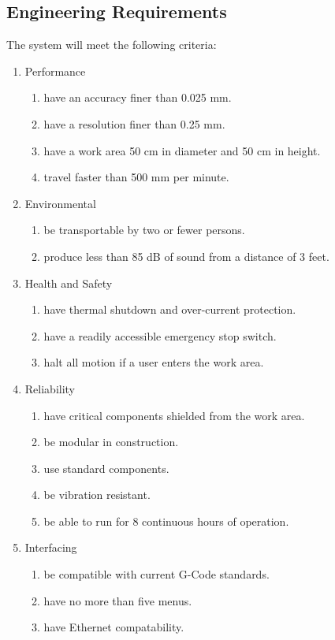 \documentclass[11pt]{report}
\begin{document}
\subsection{Engineering Requirements}
The system will meet the following criteria:
\begin{enumerate} \parskip2pt
	\item Performance
	\begin{enumerate}
		\item have an accuracy finer than 0.025 mm.
		\item have a resolution finer than 0.25 mm.
		\item have a work area 50 cm in diameter and 50 cm in height.
		\item travel faster than 500 mm per minute.
	\end{enumerate}

	\item Environmental
	\begin{enumerate}
		\item be transportable by two or fewer persons.
		\item produce less than 85 dB of sound from a distance of 3 feet.
	\end{enumerate}

	\item Health and Safety
	\begin{enumerate}
		\item have thermal shutdown and over-current protection.
		\item have a readily accessible emergency stop switch.
		\item halt all motion if a user enters the work area.
	\end{enumerate}

	\item Reliability
	\begin{enumerate}
		\item have critical components shielded from the work area.
		\item be modular in construction.
		\item use standard components.
		\item be vibration resistant.
		\item be able to run for 8 continuous hours of operation.
	\end{enumerate}

	\item Interfacing
	\begin{enumerate}
		\item be compatible with current G-Code standards.
		\item have no more than five menus.
		\item have Ethernet compatability.
	\end{enumerate}
\end{enumerate}
\end{document}
